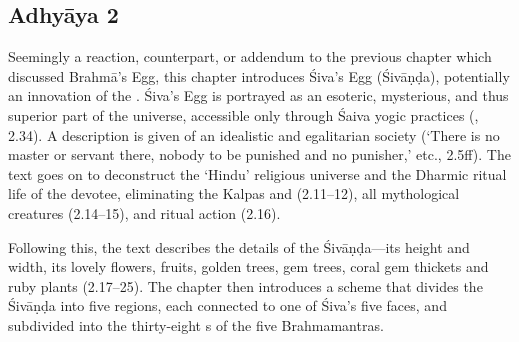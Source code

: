 %

 
\subsection*{Adhyāya 2}\label{contents_of_ch02}
Seemingly a reaction, counterpart, or addendum to the previous chapter which
discussed Brahmā's Egg, this chapter introduces Śiva's Egg (Śivā\-ṇḍa),
potentially an innovation of the \VSS. Śiva's Egg is portrayed as an esoteric, mysterious, and
thus superior part of the universe, accessible only through 
Śaiva yogic practices (, 2.34). A description is given of
an idealistic and egalitarian society (`There is no master or servant there, 
nobody to be punished and no punisher,' etc., 2.5ff). The text goes on 
to deconstruct the `Hindu' religious universe and the Dharmic ritual 
life of the devotee, eliminating the Kalpas and  (2.11--12), 
all mythological creatures (2.14--15), and ritual action (2.16).

Following this, the text describes the details of the Śivāṇḍa---its 
height and width, its lovely flowers, fruits, golden trees, 
gem trees, coral gem thickets and ruby plants (2.17--25). 
The chapter then introduces a scheme that divides the Śivāṇḍa 
into five regions, each connected to one of Śiva's five faces, and
subdivided into the thirty-eight s of the five Brahmamantras.

